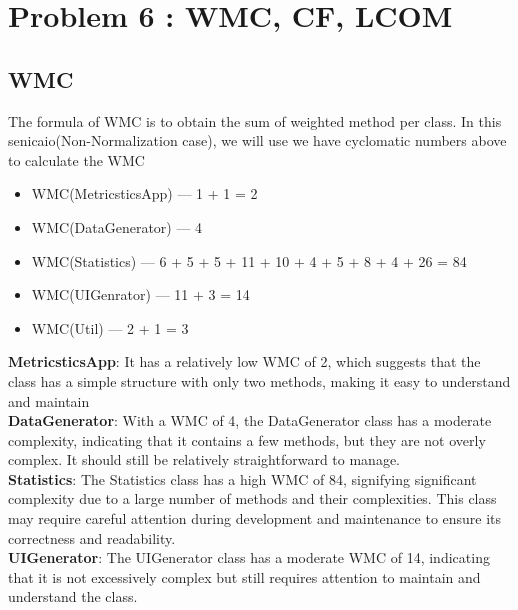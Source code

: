 \documentclass[12pt,letterpaper]{report}
\begin{document}
\chapter{Problem 6 : WMC, CF, LCOM}

\section{WMC}
The formula of WMC is to obtain the sum of weighted method per class. In this senicaio(Non-Normalization case), we will use we have cyclomatic numbers above to calculate the WMC\\

\begin{itemize}
     \item WMC(MetricsticsApp)  —  1 + 1 = 2
     \item WMC(DataGenerator) — 4
    
     \item WMC(Statistics) — 6 + 5 + 5 + 11 + 10 + 4 + 5 + 8 + 4 + 26 = 84
    
     \item WMC(UIGenrator) — 11 + 3 = 14
    
     \item WMC(Util) — 2 + 1 = 3
\end{itemize}

\textbf{MetricsticsApp}: It has a relatively low WMC of 2, which suggests that the class has a simple structure with only two methods, making it easy to understand and maintain\\

\textbf{DataGenerator}: With a WMC of 4, the DataGenerator class has a moderate complexity, indicating that it contains a few methods, but they are not overly complex. It should still be relatively straightforward to manage.\\

\textbf{Statistics}: The Statistics class has a high WMC of 84, signifying significant complexity due to a large number of methods and their complexities. This class may require careful attention during development and maintenance to ensure its correctness and readability.\\

\textbf{UIGenerator}: The UIGenerator class has a moderate WMC of 14, indicating that it is not excessively complex but still requires attention to maintain and understand the class.\\
\end{document}
